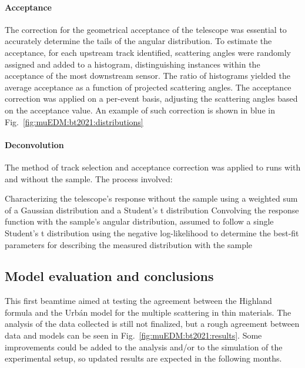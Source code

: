\begin{refsection}
        \paragraph{Acceptance}
        The correction for the geometrical acceptance of the telescope was essential to accurately determine the tails of the angular distribution.
        To estimate the acceptance, for each upstream track identified, scattering angles were randomly assigned and added to a histogram, distinguishing instances within the acceptance of the most downstream sensor. 
        The ratio of histograms yielded the average acceptance as a function of projected scattering angles. 
        The acceptance correction was applied on a per-event basis, adjusting the scattering angles based on the acceptance value. 
        An example of such correction is shown in blue in Fig.~\ref{fig:muEDM:bt2021:distributions}
        
        \paragraph{Deconvolution}
        The method of track selection and acceptance correction was applied to runs with and without the sample. 
        The process involved:
        \begin{outline}
            \1 Characterizing the telescope's response without the sample using a weighted sum of a Gaussian distribution and a Student's t distribution
            \1 Convolving the response function with the sample's angular distribution, assumed to follow a single Student's t distribution
            \1 using the negative log-likelihood to determine the best-fit parameters for describing the measured distribution with the sample
        \end{outline}
    
    \subsection{Model evaluation and conclusions}
        This first beamtime aimed at testing the agreement between the Highland formula and the \gf Urb\'{a}n model for the multiple scattering in thin materials.
        The analysis of the data collected is still not finalized, but a rough agreement between data and models can be seen in Fig.~\ref{fig:muEDM:bt2021:results}.
        Some improvements could be added to the analysis and/or to the simulation of the experimental setup, so updated results are expected in the following months.
        

\end{refsection}
